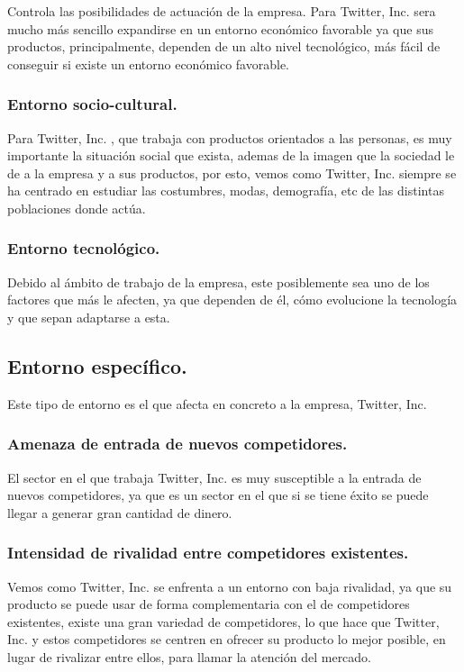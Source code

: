 Controla las posibilidades de actuación de la empresa. Para Twitter, Inc. sera mucho más sencillo expandirse en un entorno económico favorable ya que sus productos, principalmente, dependen de un alto nivel tecnológico, más fácil de conseguir si existe un entorno económico favorable.

\subsubsection{Entorno socio-cultural.}

Para Twitter, Inc. , que trabaja con productos orientados a las personas, es muy importante la situación social que exista, ademas de la imagen que la sociedad le de a la empresa y a sus productos, por esto, vemos como Twitter, Inc. siempre se ha centrado en estudiar las costumbres, modas, demografía, etc de las distintas poblaciones donde actúa.

\subsubsection{Entorno tecnológico.}

Debido al ámbito de trabajo de la empresa, este posiblemente sea uno de los factores que más le afecten, ya que dependen de él, cómo evolucione la tecnología y que sepan adaptarse a esta.


\subsection{Entorno específico.}

Este tipo de entorno es el que afecta en concreto a la empresa, Twitter, Inc.

\subsubsection{Amenaza de entrada de nuevos competidores.}

El sector en el que trabaja Twitter, Inc. es muy susceptible a la entrada de nuevos competidores, ya que es un sector en el que si se tiene éxito se puede llegar a generar gran cantidad de dinero.

\subsubsection{Intensidad de rivalidad entre competidores existentes.}

Vemos como Twitter, Inc. se enfrenta a un entorno con baja rivalidad, ya que su producto se puede usar de forma complementaria con el de competidores existentes, existe una gran variedad de competidores, lo que hace que Twitter, Inc. y estos competidores se centren en ofrecer su producto lo mejor posible, en lugar de rivalizar entre ellos, para llamar la atención del mercado.

